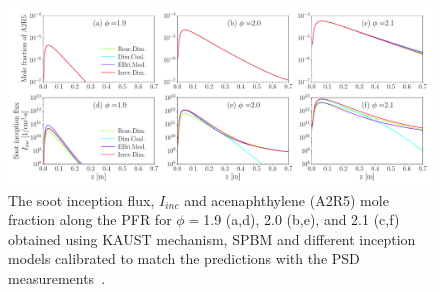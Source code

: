 

\begin{figure}[H]
	\centering
	\includegraphics[width=1\textwidth]{Figures/Results/PSR/I_inc_PAH_eq_ratio_all_single_mech.pdf}
	\caption{The soot inception flux, $I_{inc}$ and acenaphthylene (A2R5) mole fraction along the PFR for $\phi=$1.9 (a,d), 2.0 (b,e), and 2.1 (c,f) obtained using KAUST mechanism, SPBM and different inception models calibrated to match the predictions with the PSD measurements~\citep{manzello2007soot}.}
	\label{fig:psrpfr_Iinc_PAH} 
\end{figure}

